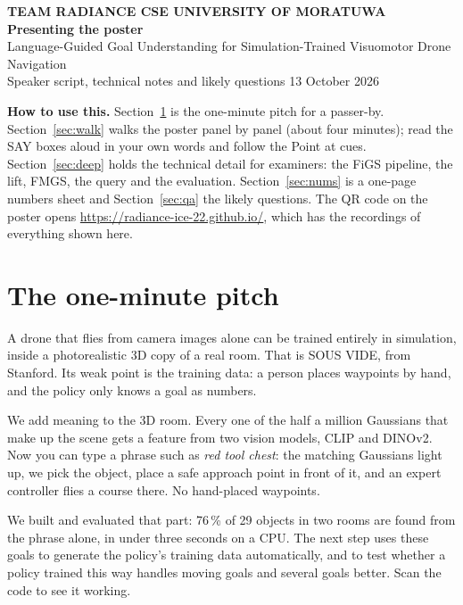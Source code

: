 \documentclass[11pt,a4paper]{article}
\begin{document}
\begin{center}
{\sffamily\small\color{maroon}\textbf{TEAM RADIANCE \textperiodcentered{} CSE \textperiodcentered{} UNIVERSITY OF MORATUWA}}\\[6pt]
{\sffamily\LARGE\bfseries Presenting the poster}\\[4pt]
{\sffamily\large Language-Guided Goal Understanding for Simulation-Trained Visuomotor Drone Navigation}\\[8pt]
{\small Speaker script, technical notes and likely questions \textperiodcentered{} 13 October 2026}
\end{center}

\vspace{4pt}
\begin{key}\sffamily\small
\textbf{How to use this.} Section~\ref{sec:pitch} is the one-minute pitch for a passer-by.
Section~\ref{sec:walk} walks the poster panel by panel (about four minutes); read the \textsf{SAY} boxes
aloud in your own words and follow the \textsf{Point at} cues. Section~\ref{sec:deep} holds the technical
detail for examiners: the FiGS pipeline, the lift, FMGS, the query and the evaluation. Section~\ref{sec:nums}
is a one-page numbers sheet and Section~\ref{sec:qa} the likely questions. The QR code on the poster opens
\url{https://radiance-ice-22.github.io/}, which has the recordings of everything shown here.
\end{key}

\section{The one-minute pitch}\label{sec:pitch}

\begin{say}
A drone that flies from camera images alone can be trained entirely in simulation, inside a
photorealistic 3D copy of a real room. That is SOUS VIDE, from Stanford. Its weak point is the training
data: a person places waypoints by hand, and the policy only knows a goal as numbers.

We add meaning to the 3D room. Every one of the half a million Gaussians that make up the scene gets a
feature from two vision models, CLIP and DINOv2. Now you can type a phrase such as \emph{red tool chest}:
the matching Gaussians light up, we pick the object, place a safe approach point in front of it, and an
expert controller flies a course there. No hand-placed waypoints.

We built and evaluated that part: 76\,\% of 29 objects in two rooms are found from the phrase alone, in
under three seconds on a CPU. The next step uses these goals to generate the policy's training data
automatically, and to test whether a policy trained this way handles moving goals and several goals better.
Scan the code to see it working.
\end{say}
\end{document}

